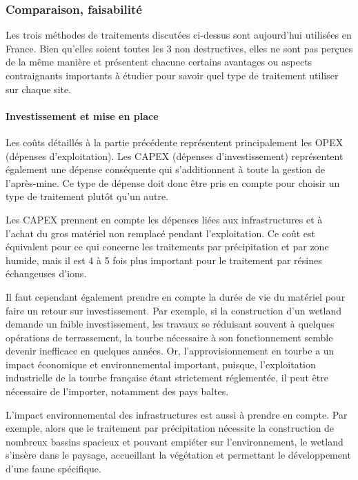 \documentclass{article}
\begin{document}
\subsubsection{Comparaison, faisabilité}
Les trois méthodes de traitements discutées ci-dessus sont aujourd’hui utilisées en France. Bien qu’elles soient toutes les 3 non destructives, elles ne sont pas perçues de la même manière et présentent chacune certains avantages ou aspects contraignants importants à étudier pour savoir quel type de traitement utiliser sur chaque site.


\paragraph{Investissement et mise en place}

Les coûts détaillés à la partie précédente représentent principalement les OPEX (dépenses d’exploitation). Les CAPEX (dépenses d’investissement) représentent également une dépense conséquente qui s'additionnent à toute la gestion de l’après-mine. Ce type de dépense doit donc être pris en compte pour choisir un type de traitement plutôt qu’un autre.

Les CAPEX prennent en compte les dépenses liées aux infrastructures et à l’achat du gros matériel non remplacé pendant l’exploitation. Ce coût est équivalent pour ce qui concerne les traitements par précipitation et par zone humide, mais il est 4 à 5 fois plus important pour le traitement par résines échangeuses d’ions.

Il faut cependant également prendre en compte la durée de vie du matériel pour faire un retour sur investissement. Par exemple, si la construction d’un wetland demande un faible investissement, les travaux se réduisant souvent à quelques opérations de terrassement, la tourbe nécessaire à son fonctionnement semble devenir inefficace en quelques années. Or, l’approvisionnement en tourbe a un impact économique et environnemental important, puisque, l’exploitation industrielle de la tourbe française étant strictement réglementée, il peut être nécessaire de l’importer, notamment des pays baltes. 

L’impact environnemental des infrastructures est aussi à prendre en compte. Par exemple, alors que le traitement par précipitation nécessite la construction de nombreux bassins spacieux et pouvant empiéter sur l’environnement, le wetland s’insère dans le paysage, accueillant la végétation et permettant le développement d’une faune spécifique.
\end{document}
